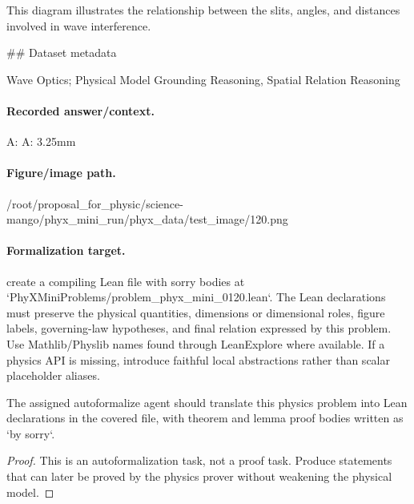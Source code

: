 This diagram illustrates the relationship between the slits, angles, and distances involved in wave interference.

\#\# Dataset metadata

Wave Optics; Physical Model Grounding Reasoning, Spatial Relation Reasoning

\paragraph{Recorded answer/context.}
A: A: 3.25mm

\paragraph{Figure/image path.}
/root/proposal\_for\_physic/science-mango/phyx\_mini\_run/phyx\_data/test\_image/120.png

\paragraph{Formalization target.}
create a compiling Lean file with sorry bodies at `PhyXMiniProblems/problem\_phyx\_mini\_0120.lean`. The Lean declarations must preserve the physical quantities, dimensions or dimensional roles, figure labels, governing-law hypotheses, and final relation expressed by this problem.
Use Mathlib/Physlib names found through LeanExplore where available. If a physics API is missing, introduce faithful local abstractions rather than scalar placeholder aliases.

\begin{theorem}
\label{thm:physics:phyx_mini_0120:target}
The assigned autoformalize agent should translate this physics problem into Lean declarations in the covered file, with theorem and lemma proof bodies written as `by sorry`.
\end{theorem}
\begin{proof}
This is an autoformalization task, not a proof task. Produce statements that can later be proved by the physics prover without weakening the physical model.
\end{proof}

